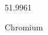 \documentclass[12pt]{article}
\begin{document}
\hfill{}
\vfill
\begin{center}
  {\fontsize{50}{60}
  }

  \vspace{1em}

  51.9961

Chromium
\end{center}
\vfill
\end{document}
